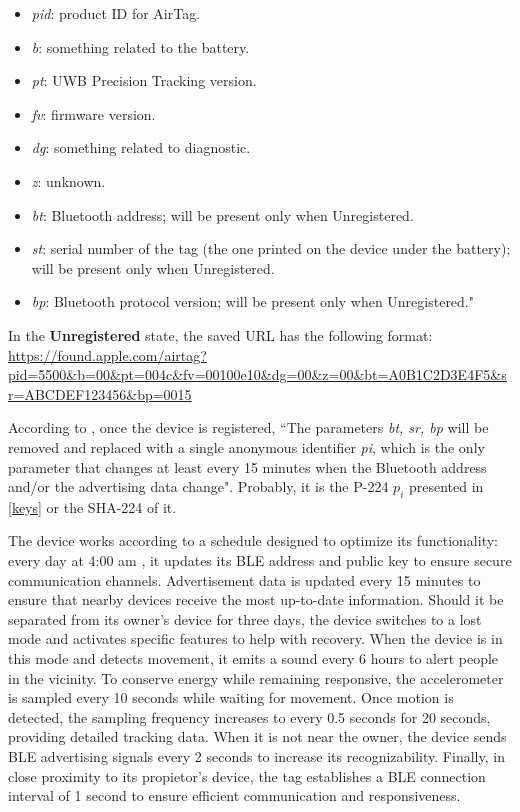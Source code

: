 \documentclass[english]{article}
\begin{document}
\begin{itemize}
  \item \textit{pid}: product ID for AirTag.
  \item \textit{b}: something related to the battery.
  \item \textit{pt}: UWB Precision Tracking version.
  \item \textit{fv}: firmware version.
  \item \textit{dg}: something related to diagnostic.
  \item \textit{z}: unknown.
  \item \textit{bt}: Bluetooth address; will be present only when Unregistered.
  \item \textit{st}: serial number of the tag (the one printed on the device under the battery); will be present only when Unregistered.
  \item \textit{bp}: Bluetooth protocol version; will be present only when Unregistered."
\end{itemize}
In the \textbf{Unregistered} state, the saved URL has the following format:
\url{https://found.apple.com/airtag?pid=5500&b=00&pt=004c&fv=00100e10&dg=00&z=00&bt=A0B1C2D3E4F5&sr=ABCDEF123456&bp=0015}

According to \cite{reverse},
once the device is registered, ``The parameters \textit{bt, sr, bp} will be removed and replaced with a single anonymous identifier \textit{pi}, which is the only parameter that changes at least every 15 minutes when the Bluetooth address and/or the advertising data change". Probably, it is the P-224 $p_i$ presented in \ref{keys} or the SHA-224 of it. 

The device works according to a schedule designed to optimize its functionality:
every day at 4:00 am , it updates its BLE address and public key to ensure secure communication channels.
Advertisement data is updated every 15 minutes to ensure that nearby devices receive the most up-to-date information.
Should it be separated from its owner's device for three days, the device switches to a lost mode and activates specific features to help with recovery.
When the device is in this mode and detects movement, it emits a sound every 6 hours to alert people in the vicinity.
To conserve energy while remaining responsive, the accelerometer is sampled every 10 seconds while waiting for movement. Once motion is detected, the sampling frequency increases to every 0.5 seconds for 20 seconds, providing detailed tracking data.
When it is not near the owner, the device sends BLE advertising signals every 2 seconds to increase its recognizability.
Finally, in close proximity to its propietor’s device, the tag establishes a BLE connection interval of 1 second to ensure efficient communication and responsiveness.
\end{document}
